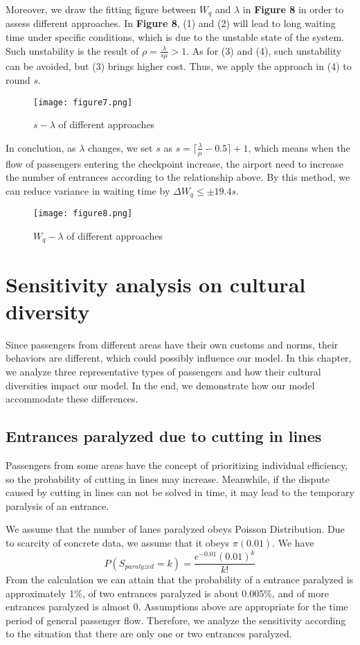 \documentclass{mcmthesis}
\begin{document}
Moreover, we draw the fitting figure between $W_q$ and $\lambda$ in \textbf{Figure 8} in order to assess different  approaches. In \textbf{Figure 8}, (1) and (2) will lead to long waiting time under specific conditions, which is due to the unstable state of the system. Such unstability is the result of $\rho=\frac{\lambda}{s\mu}>1$. As for (3) and (4), such unstability can be avoided, but (3) brings higher cost. Thus, we apply the approach in (4) to round $s$. 
\begin{figure}[H]
\small
\centering
\texttt{[image: figure7.png]}
\caption{$s-\lambda$ of different approaches} \label{fig:7}
\end{figure} 

In conclution, as $\lambda$ changes, we set $s$ as $s=\lceil\frac{\lambda}{\mu}-0.5\rceil+1$, which means when the flow of passengers entering the checkpoint increase, the airport need to increase the number of entrances according to the relationship above. By this method, we can reduce variance in waiting time by $\Delta W_q \leq \pm19.4s$.
\begin{figure}[H]
\small
\centering
\texttt{[image: figure8.png]}
\caption{$W_q-\lambda$ of different approaches} \label{fig:8}
\end{figure}
\section{Sensitivity analysis on cultural diversity}
Since passengers from different areas have their own customs and norms, their behaviors are different, which could possibly influence our model. In this chapter, we analyze three representative types of passengers and how their cultural diversities impact our model. In the end, we demonstrate how our model accommodate these differences. 
\subsection{Entrances paralyzed due to cutting in lines}
Passengers from some areas have the concept of prioritizing individual efficiency, so the probability of cutting in lines may increase. Meanwhile, if the dispute caused by cutting in lines can not be solved in time, it may lead to the temporary paralysis of an entrance.

We assume that the number of lanes paralyzed obeys Poisson Distribution. Due to scarcity of concrete data, we assume that it obeys $\pi(0.01)$. We have
$$P(S_{paralyzed}=k)=\frac{e^{-0.01}(0.01)^k}{k!}$$
From the calculation we can attain that the probability of a entrance paralyzed is approximately 1\%, of two entrances paralyzed is about 0.005\%, and of more entrances paralyzed is almost 0. Assumptions above are appropriate for the time period of general passenger flow. Therefore, we analyze the sensitivity according to the situation that there are only one or two entrances paralyzed.
\end{document}
